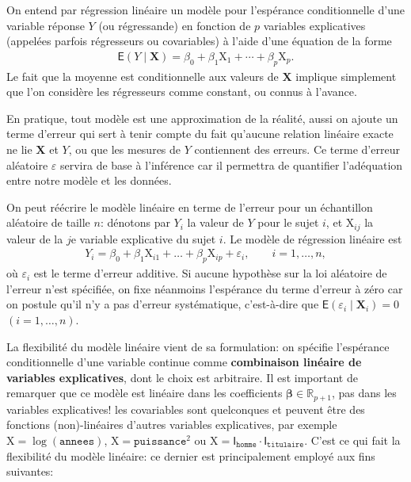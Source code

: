 \documentclass[
  11pt,
  letterpaper,
]{article}
\theoremstyle{definition}
\theoremstyle{definition}
\theoremstyle{definition}
\theoremstyle{definition}
\theoremstyle{remark}
\begin{document}
On entend par régression linéaire un modèle pour l'espérance conditionnelle d'une variable réponse \(Y\) (ou régressande) en fonction de \(p\) variables explicatives (appelées parfois régresseurs ou covariables) à l'aide d'une équation de la forme
\begin{align*}
\mathsf{E}(Y \mid \mathbf{X})=\beta_0 + \beta_1\mathrm{X}_{1} + \cdots + \beta_p \mathrm{X}_{p}.
\end{align*}
Le fait que la moyenne est conditionnelle aux valeurs de \(\mathbf{X}\) implique simplement que l'on considère les régresseurs comme constant, ou connus à l'avance.

En pratique, tout modèle est une approximation de la réalité, aussi on ajoute un terme d'erreur qui sert à tenir compte du fait qu'aucune relation linéaire exacte ne lie \(\mathbf{X}\) et \(Y\), ou que les mesures de \(Y\) contiennent des erreurs. Ce terme d'erreur aléatoire \(\varepsilon\) servira de base à l'inférence car il permettra de quantifier l'adéquation entre notre modèle et les données.

On peut réécrire le modèle linéaire en terme de l'erreur pour un échantillon aléatoire de taille \(n\): dénotons par \(Y_i\) la valeur de \(Y\) pour le sujet \(i\), et \(\mathrm{X}_{ij}\) la valeur de la \(j\)e variable explicative du sujet \(i\). Le modèle de régression linéaire est
\begin{align}
Y_i = \beta_0 + \beta_1 \mathrm{X}_{i1} + \ldots + \beta_p \mathrm{X}_{ip} +\varepsilon_{i}, \qquad i =1, \ldots, n, \label{eq:olsmean}
\end{align}
où \(\varepsilon_i\) est le terme d'erreur additive. Si aucune hypothèse sur la loi aléatoire de l'erreur n'est spécifiée, on fixe néanmoins l'espérance du terme d'erreur à zéro car on postule qu'il n'y a pas d'erreur systématique, c'est-à-dire que \(\mathsf{E}(\varepsilon_i \mid \boldsymbol{X}_i)=0\) \((i=1, \ldots, n)\).

La flexibilité du modèle linéaire vient de sa formulation: on spécifie l'espérance conditionnelle d'une variable continue comme \textbf{combinaison linéaire de variables explicatives}, dont le choix est arbitraire.
Il est important de remarquer que ce modèle est linéaire dans les coefficients \(\boldsymbol{\beta}\in \mathbb{R}_{p+1}\), pas dans les variables explicatives! les covariables sont quelconques et peuvent être des fonctions (non)-linéaires d'autres variables explicatives, par exemple \(\mathrm{X}=\log(\texttt{annees})\), \(\mathrm{X}=\texttt{puissance}^2\) ou \(\mathrm{X}= \mathsf{I}_{\texttt{homme}}\cdot\mathsf{I}_{\texttt{titulaire}}\). C'est ce qui fait la flexibilité du modèle linéaire: ce dernier est principalement employé aux fins suivantes:
\end{document}
